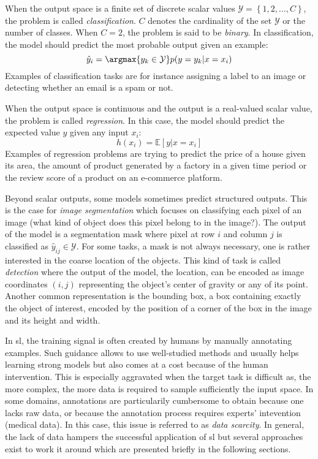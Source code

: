 When the output space is a finite set of discrete scalar values $\mathcal{Y} = \left\{1, 2, ..., C\right\}$, the problem is called \textit{classification}. $C$ denotes the cardinality of the set $\mathcal{Y}$ or the number of classes. When $C = 2$, the problem is said to be \textit{binary}. In classification, the model should predict the most probable output given an example:
\begin{equation}
\hat{y}_i = \argmax{y_k \in \mathcal{Y}} p(y=y_k|x=x_i)
\end{equation}
Examples of classification tasks are for instance assigning a label to an image or detecting whether an email is a spam or not. 

When the output space is continuous and the output is a real-valued scalar value, the problem is called \textit{regression}. In this case, the model should predict the expected value $y$ given any input $x_i$:
\begin{equation}
h(x_i) = \mathbb{E}\left[y|x=x_i\right]
\end{equation}
Examples of regression problems are trying to predict the price of a house given its area, the amount of product generated by a factory in a given time period or the review score of a product on an e-commerce platform. 

Beyond scalar outputs, some models sometimes predict structured outputs. This is the case for \textit{image segmentation} which focuses on classifying each pixel of an image (\ie what kind of object does this pixel belong to in the image?). The output of the model is a segmentation mask where pixel at row $i$ and column $j$ is classified as $\hat{y}_{ij} \in \mathcal{Y}$. For some tasks, a mask is not always necessary, one is rather interested in the coarse location of the objects. This kind of task is called \textit{detection} where the output of the model, the location, can be encoded as image coordinates $(i, j)$ representing the object's center of gravity or any of its point. Another common representation is the bounding box, a box containing exactly the object of interest, encoded by the position of a corner of the box in the image and its height and width.

In \acrlong{sl}, the training signal is often created by humans by manually annotating examples. Such guidance allows to use well-studied methods and usually helps learning strong models but also comes at a cost because of the human intervention. This is especially aggravated when the target task is difficult as, the more complex, the more data is required to sample sufficiently the input space. In some domains, annotations are particularily cumbersome to obtain because one lacks raw data, or because the annotation process requires experts' intevention (\eg medical data). In this case, this issue is referred to as \textit{data scarcity}. In general, the lack of data hampers the successful application of \acrlong{sl} but several approaches exist to work it around which are presented briefly in the following sections. 

